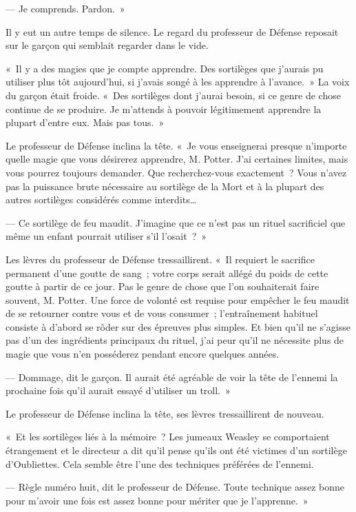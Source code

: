 --- Je comprends.
Pardon.~»

Il y eut un autre temps de silence.
Le regard du professeur de Défense reposait sur le garçon qui semblait regarder dans le vide.

«~Il y a des magies que je compte apprendre.
Des sortilèges que j'aurais pu utiliser plus tôt aujourd'hui, si j'avais songé à les apprendre à l'avance.~»
La voix du garçon était froide.
«~Des sortilèges dont j'aurai besoin, si ce genre de chose continue de se produire.
Je m'attends à pouvoir légitimement apprendre la plupart d'entre eux.
Mais pas tous.~»

Le professeur de Défense inclina la tête.
«~Je vous enseignerai presque n'importe quelle magie que vous désirerez apprendre, M. Potter.
J'ai certaines limites, mais vous pourrez toujours demander.
Que recherchez-vous exactement~?
Vous n'avez pas la puissance brute nécessaire au sortilège de la Mort et à la plupart des autres sortilèges considérés comme interdits…

--- Ce sortilège de feu maudit.
J'imagine que ce n'est pas un rituel sacrificiel que même un enfant pourrait utiliser s'il l'osait~?~»

Les lèvres du professeur de Défense tressaillirent.
«~Il requiert le sacrifice permanent d'une goutte de sang~; votre corps serait allégé du poids de cette goutte à partir de ce jour.
Pas le genre de chose que l'on souhaiterait faire souvent, M. Potter.
Une force de volonté est requise pour empêcher le feu maudit de se retourner contre vous et de vous consumer~; l'entraînement habituel consiste à d'abord se rôder sur des épreuves plus simples.
Et bien qu'il ne s'agisse pas d'un des ingrédients principaux du rituel, j'ai peur qu'il ne nécessite plus de magie que vous n'en posséderez pendant encore quelques années.

--- Dommage, dit le garçon.
Il aurait été agréable de voir la tête de l'ennemi la prochaine fois qu'il aurait essayé d'utiliser un troll.~»

Le professeur de Défense inclina la tête, ses lèvres tressaillirent de nouveau.

«~Et les sortilèges liés à la mémoire~?
Les jumeaux Weasley se comportaient étrangement et le directeur a dit qu'il pense qu'ils ont été victimes d'un sortilège d'Oubliettes.
Cela semble être l'une des techniques préférées de l'ennemi.

--- Règle numéro huit, dit le professeur de Défense.
Toute technique assez bonne pour m'avoir une fois est assez bonne pour mériter que je l'apprenne.~»

